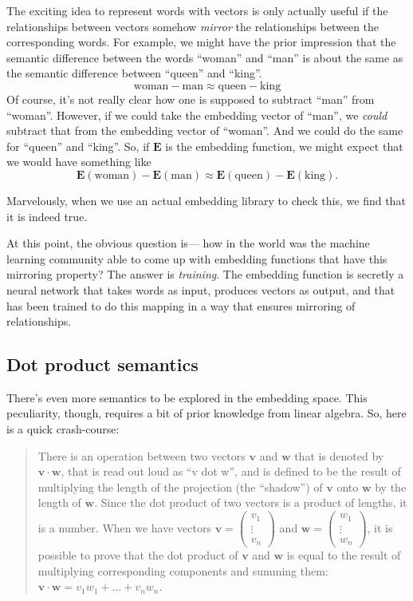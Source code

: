 \documentclass{article}
\newcommand{\vv}{\mathbf{v}}
\newcommand{\ww}{\mathbf{w}}
\begin{document}
The exciting idea to represent words with vectors is only actually useful if the relationships between vectors somehow \textit{mirror} the relationships between the corresponding words. For example, we might have the prior impression that the semantic difference between the words ``woman'' and ``man'' is about the same as the semantic difference between ``queen'' and ``king''.
$$
\text{woman} - \text{man} \approx \text{queen} - \text{king}
$$
Of course, it's not really clear how one is supposed to subtract ``man'' from ``woman''. However, if we could take the embedding vector of ``man'', we \textit{could} subtract that from the embedding vector of ``woman''. And we could do the same for ``queen'' and ``king''. So, if $\mathbf{E}$ is the embedding function, we might expect that we would have something like
$$
\mathbf{E}(\text{woman}) - \mathbf{E}(\text{man}) \approx \mathbf{E}(\text{queen}) - \mathbf{E}(\text{king}).
$$

Marvelously, when we use an actual embedding library to check this, we find that it is indeed true.

At this point, the obvious question is--- how in the world was the machine learning community able to come up with embedding functions that have this mirroring property? The answer is \textit{training}. The embedding function is secretly a neural network that takes words as input, produces vectors as output, and that has been trained to do this mapping in a way that ensures mirroring of relationships.

\subsection*{Dot product semantics}

There's even more semantics to be explored in the embedding space. This peculiarity, though, requires a bit of prior knowledge from linear algebra. So, here is a quick crash-course:

\begin{quote}
There is an operation between two vectors $\vv$ and $\ww$ that is denoted by $\vv \cdot \ww$, that is read out loud as ``v dot w'', and is defined to be the result of multiplying the length of the projection (the ``shadow'') of $\vv$ onto $\ww$ by the length of $\ww$. Since the dot product of two vectors is a product of lengths, it is a number. When we have vectors $\vv = \begin{pmatrix} v_1 \\ \vdots \\ v_n \end{pmatrix}$ and $\ww = \begin{pmatrix} w_1 \\ \vdots \\ w_n \end{pmatrix}$, it is possible to prove that the dot product of $\vv$ and $\ww$ is equal to the result of multiplying corresponding components and summing them: $\vv \cdot \ww = v_1 w_1 + \ldots + v_n w_n$.
\end{quote}
\end{document}
